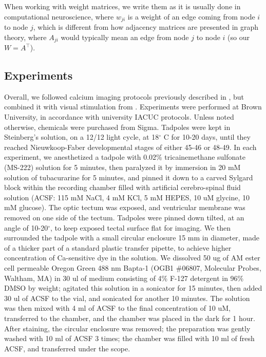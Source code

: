 \documentclass{article}
\begin{document}
When working with weight matrices, we write them as it is usually done in computational neuroscience, where $w_{ji}$ is a weight of an edge coming from node $i$ to node $j$, which is different from how adjacency matrices are presented in graph theory, where $A_{ji}$ would typically mean an edge from node $j$ to node $i$ (so our $W = A^\top$).

\subsection*{Experiments}

Overall, we followed calcium imaging protocols previously described in \citep{xu2011,truszkowski2017}, but combined it with visual stimulation from \citep{khakhalin2014}. Experiments were performed at Brown University, in accordance with university IACUC protocols. Unless noted otherwise, chemicals were purchased from Sigma. Tadpoles were kept in Steinberg’s solution, on a 12/12 light cycle, at 18$^\circ$ C for 10-20 days, until they reached Nieuwkoop-Faber developmental stages of either 45-46 or 48-49. In each experiment, we anesthetized a tadpole with 0.02\% tricainemethane sulfonate (MS-222) solution for 5 minutes, then paralyzed it by immersion in 20 mM solution of tubacurarine for 5 minutes, and pinned it down to a carved Sylgard block within the recording chamber filled with artificial cerebro-spinal fluid solution (ACSF: 115 mM NaCl, 4 mM KCl, 5 mM HEPES, 10 uM glycine, 10 mM glucose). The optic tectum was exposed, and ventricular membrane was removed on one side of the tectum. Tadpoles were pinned down tilted, at an angle of 10-20$^\circ$, to keep exposed tectal surface flat for imaging. We then surrounded the tadpole with a small circular enclosure 15 mm in diameter, made of a thicker part of a standard plastic transfer pipette, to achieve higher concentration of Ca-sensitive dye in the solution. We dissolved 50 ug of AM ester cell permeable Oregon Green 488 nm Bapta-1 (OGB1 $\#$06807, Molecular Probes, Waltham, MA) in 30 ul of medium consisting of 4\% F-127 detergent in 96\% DMSO by weight; agitated this solution in a sonicator for 15 minutes, then added 30 ul of ACSF to the vial, and sonicated for another 10 minutes. The solution was then mixed with 4 ml of ACSF to the final concentration of 10 uM, transferred to the chamber, and the chamber was placed in the dark for 1 hour. After staining, the circular enclosure was removed; the preparation was gently washed with 10 ml of ACSF 3 times; the chamber was filled with 10 ml of fresh ACSF, and transferred under the scope.
\end{document}
